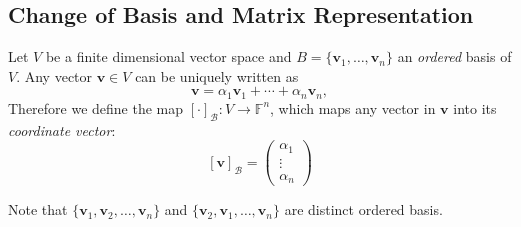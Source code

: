 \subsection{Change of Basis and Matrix Representation}

\begin{definition}
Let $V$ be a finite dimensional vector space and 
$B=\{\bm v_1,\dots,\bm v_n\}$ an \emph{ordered} basis of $V$.
Any vector $\bm v\in V$ can be uniquely written as
\[
\bm v=\alpha_1\bm v_1+\cdots+\alpha_n\bm v_n,
\]
Therefore we define the map $[\cdot]_{\mathcal{B}}:V\to\mathbb{F}^n$, 
which maps any vector in $\bm v$ into its \emph{coordinate vector}:
\[
[\bm v]_{\mathcal{B}}=\begin{pmatrix}
\alpha_1\\\vdots\\\alpha_n
\end{pmatrix}
\]
\end{definition}
\begin{remark}
Note that $\{\bm v_1,\bm v_2,\dots,\bm v_n\}$ and $\{\bm v_2,\bm v_1,\dots,\bm v_n\}$ are distinct ordered basis.
\end{remark}

